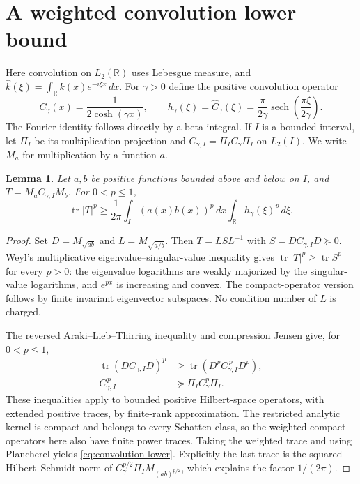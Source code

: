 \documentclass[11pt]{article}
\newtheorem{lemma}[theorem]{Lemma}
\numberwithin{equation}{section}
\newcommand{\tr}{\operatorname{tr}}
\newcommand{\sech}{\operatorname{sech}}
\newcommand{\R}{\mathbb R}
\begin{document}
\section{A weighted convolution lower bound}

Here convolution on $L_2(\R)$ uses Lebesgue measure, and
$\widehat k(\xi)=\int_\R k(x)e^{-i\xi x}\,dx$.
For $\gamma>0$ define the positive convolution operator
\begin{equation}\label{eq:cauchy-symbol}
 C_\gamma(x)=\frac1{2\cosh(\gamma x)},\qquad
 h_\gamma(\xi)=\widehat C_\gamma(\xi)
       =\frac{\pi}{2\gamma}\sech\!\left(\frac{\pi\xi}{2\gamma}\right).
\end{equation}
The Fourier identity follows directly by a beta integral. If $I$ is a
bounded interval, let $\Pi_I$ be its multiplication projection and
$C_{\gamma,I}=\Pi_I C_\gamma\Pi_I$ on $L_2(I)$. We write $M_a$ for
multiplication by a function $a$.

\begin{lemma}\label{lem:convolution}
Let $a,b$ be positive functions bounded above and below on $I$, and
$T=M_aC_{\gamma,I}M_b$. For $0<p\le1$,
\begin{equation}\label{eq:convolution-lower}
 \tr|T|^p\ge\frac1{2\pi}
       \int_I(a(x)b(x))^p\,dx
       \int_\R h_\gamma(\xi)^p\,d\xi.
\end{equation}
\end{lemma}
\begin{proof}
Set $D=M_{\sqrt{ab}}$ and $L=M_{\sqrt{a/b}}$. Then
$T=L S L^{-1}$ with $S=DC_{\gamma,I}D\succeq0$.
Weyl's multiplicative eigenvalue--singular-value inequality gives
$\tr|T|^p\ge\tr S^p$ for every $p>0$: the eigenvalue logarithms are
weakly majorized by the singular-value logarithms, and $e^{px}$ is
increasing and convex. The compact-operator version follows by finite
invariant eigenvector subspaces. No condition number of $L$ is charged.

The reversed Araki--Lieb--Thirring inequality
\cite[Theorem~1]{Audenaert} and compression Jensen
\cite[Theorem~2.1 and Corollary~2.3]{HP} give, for $0<p\le1$,
\begin{align*}
 \tr(DC_{\gamma,I}D)^p
 &\ge\tr(D^p C_{\gamma,I}^{\,p}D^p),\\
 C_{\gamma,I}^{\,p}&\succeq\Pi_I C_\gamma^p\Pi_I.
\end{align*}
These inequalities apply to bounded positive Hilbert-space operators,
with extended positive traces, by finite-rank approximation. The
restricted analytic kernel is compact and belongs to every Schatten
class, so the weighted compact operators here also have finite power
traces. Taking the weighted trace and using Plancherel yields
\eqref{eq:convolution-lower}. Explicitly the last trace is the squared
Hilbert--Schmidt norm of $C_\gamma^{p/2}\Pi_I M_{(ab)^{p/2}}$, which
explains the factor $1/(2\pi)$.
\end{proof}
\end{document}
